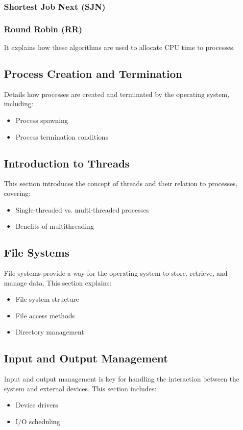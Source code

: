 \documentclass[12pt]{article}
\begin{document}
	\subsubsection{Shortest Job Next (SJN)}
	\subsubsection{Round Robin (RR)}
	It explains how these algorithms are used to allocate CPU time to processes.
	
	\subsection{Process Creation and Termination}
	Details how processes are created and terminated by the operating system, including:
	\begin{itemize}
		\item Process spawning
		\item Process termination conditions
	\end{itemize}
	
	\subsection{Introduction to Threads}
	This section introduces the concept of threads and their relation to processes, covering:
	\begin{itemize}
		\item Single-threaded vs. multi-threaded processes
		\item Benefits of multithreading
	\end{itemize}
	
	\subsection{File Systems}
	File systems provide a way for the operating system to store, retrieve, and manage data. This section explains:
	\begin{itemize}
		\item File system structure
		\item File access methods
		\item Directory management
	\end{itemize}
	
	\subsection{Input and Output Management}
	Input and output management is key for handling the interaction between the system and external devices. This section includes:
	\begin{itemize}
		\item Device drivers
		\item I/O scheduling
	\end{itemize}
	
\end{document}
